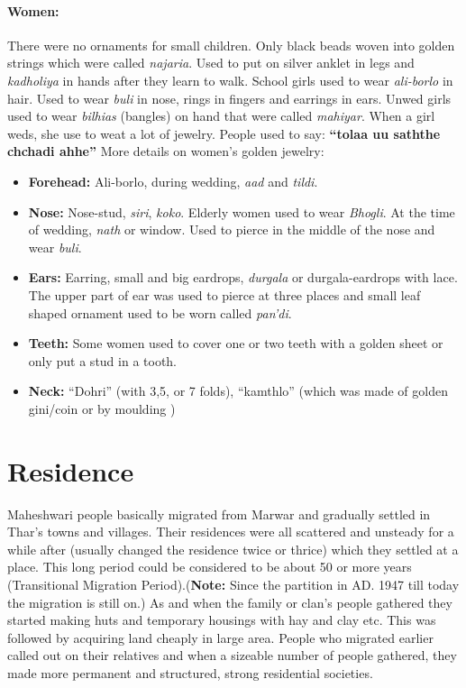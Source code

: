 \paragraph{Women:} There were no ornaments for small children. Only black beads woven into golden strings which were called \textit{najaria}. Used to put on silver anklet in legs and \textit{kadholiya} in hands after they learn to walk. School girls used to wear \textit{ali-borlo} in hair. Used to wear \textit{buli} in nose, rings in fingers and earrings in ears. Unwed girls used to wear \textit{bilhias} (bangles) on hand that were called \textit{mahiyar}. When a girl weds, she use to weat a lot of jewelry. People used to say: \textbf{``tolaa uu saththe chchadi ahhe''} More details on women's golden jewelry:
\begin{itemize}
 \item \textbf{Forehead:} Ali-borlo, during wedding, \textit{aad} and \textit{tildi}.
\item \textbf{Nose:} Nose-stud, \textit{siri}, \textit{koko}. Elderly women used to wear \textit{Bhogli}. At the time of wedding, \textit{nath} or window. Used to pierce in the middle of the nose and wear \textit{buli}.
\item \textbf{Ears:} Earring, small and big eardrops, \textit{durgala} or durgala-eardrops with lace. The upper part of ear was used to pierce at three places and small leaf shaped ornament used to be worn called \textit{pan'di}.
\item \textbf{Teeth:} Some women used to cover one or two teeth with a golden sheet or only put a stud in a tooth.
\item \textbf{Neck:} ``Dohri'' (with 3,5, or 7 folds), ``kamthlo'' (which was made of golden gini/coin or by moulding )
\end{itemize}

\section{Residence}
Maheshwari people basically migrated from Marwar and gradually settled in Thar's towns and villages. Their residences were all scattered and unsteady for a while after (usually changed the residence twice or thrice) which they settled at a place. This long period could be considered to be about 50 or more years (Transitional Migration Period).(\textbf{Note:} Since the partition in AD. 1947 till today the migration is still on.) As and when the family or clan's people gathered they started making huts and temporary housings with hay and clay etc. This was followed by acquiring land cheaply in large area. People who migrated earlier called out on their relatives and when a sizeable number of people gathered, they made more permanent and structured, strong residential societies.

